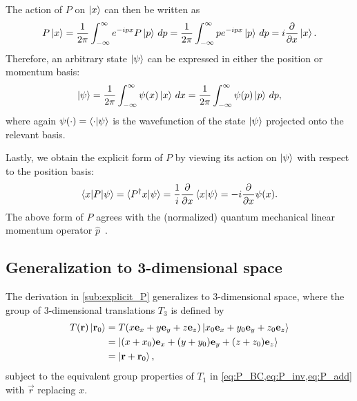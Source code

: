     The action of $P$ on $\ket{x}$ can then be written as
    \begin{align*}
        P\ket{x} = \frac{1}{2\pi}\int_{-\infty}^{\infty} e^{-ipx}P\ket{p} \,dp = \frac{1}{2\pi}\int_{-\infty}^{\infty} p e^{-ipx}\ket{p} \,dp = i\frac{\partial}{\partial x}\ket{x}.
    \end{align*}
    Therefore, an arbitrary state $\ket{\psi}$ can be expressed in either the position or momentum basis:
    \begin{align*}
        \ket{\psi} = \frac{1}{2\pi}\int_{-\infty}^{\infty} \psi(x)\ket{x} \,dx = \frac{1}{2\pi}\int_{-\infty}^{\infty} \psi(p)\ket{p} \,dp,
    \end{align*}
    where again $\psi(\cdot) = \braket{\cdot|\psi}$ is the wavefunction of the state $\ket{\psi}$ projected onto the relevant basis.

    Lastly, we obtain the explicit form of $P$ by viewing its action on $\ket{\psi}$ with respect to the position basis:
    \begin{align*}
        \braket{x|P|\psi} = \braket{P^\dagger x|\psi} = \frac{1}{i}\frac{\partial}{\partial x}\braket{x|\psi} = -i\frac{\partial}{\partial x}\psi(x).
    \end{align*}
    The above form of $P$ agrees with the (normalized) quantum mechanical linear momentum operator $\hat{p}$~\cite{Hall2013}.
    
    \subsection{Generalization to 3-dimensional space}\label{sub:3D_translations}
    The derivation in \cref{sub:explicit_P} generalizes to 3-dimensional space, where the group of 3-dimensional translations $T_3$ is defined by
    \begin{align*}
        T(\mathbf{r})\ket{\mathbf{r}_0}
            &= T(x\mathbf{e}_x + y\mathbf{e}_y + z\mathbf{e}_z)\ket{x_0\mathbf{e}_x + y_0\mathbf{e}_y + z_0\mathbf{e}_z} \\
            &= \ket{(x + x_0)\mathbf{e}_x + (y + y_0)\mathbf{e}_y + (z + z_0)\mathbf{e}_z} \\
            &= \ket{\mathbf{r}+\mathbf{r}_0},
    \end{align*}
    subject to the equivalent group properties of $T_1$ in \cref{eq:P_BC,eq:P_inv,eq:P_add} with $\vec{r}$ replacing $x$.
    

